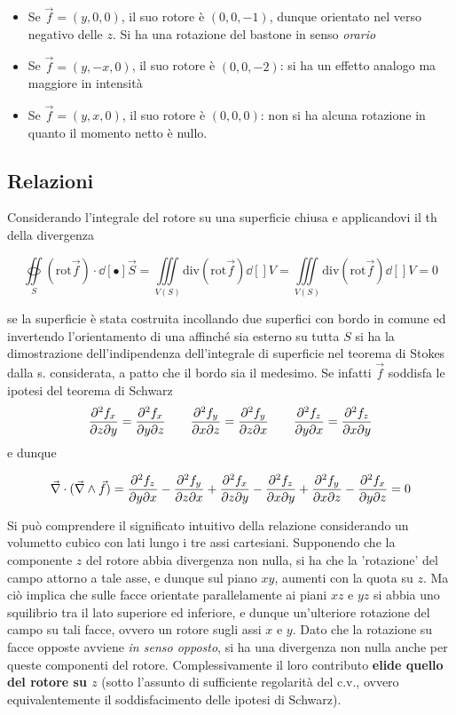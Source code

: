 \begin{itemize}

\item Se $\vec{f} = (y, 0, 0)$, il suo rotore è $(0,0,-1)$, dunque orientato nel verso negativo delle $z$. Si ha una rotazione del bastone in senso \textit{orario}

\item Se $\vec{f} = (y, -x, 0)$, il suo rotore è $(0,0,-2)$: si ha un effetto analogo ma maggiore in intensità

\item Se $\vec{f} = (y, x, 0)$, il suo rotore è $(0,0,0)$: non si ha alcuna rotazione in quanto il momento netto è nullo.

\end{itemize}

\subsection{Relazioni}

Considerando l'integrale del rotore su una superficie chiusa e applicandovi il th della divergenza

\[\oiint\limits_{S} (\mathrm{rot} \vec{f}) \cdot \dd[•]{\vec{S}} = \iiint\limits_{V(S)} \mathrm{div} (\mathrm{rot} \vec{f}) \dd[]{V} = \iiint\limits_{V(S)} \mathrm{div} (\mathrm{rot} \vec{f}) \dd[]{V} = 0\]

se la superficie è stata costruita incollando due superfici con bordo in comune ed invertendo l'orientamento di una affinché sia esterno su tutta $S$ si ha la dimostrazione dell'indipendenza dell'integrale di superficie nel teorema di Stokes dalla s. considerata, a patto che il bordo sia il medesimo. Se infatti $\vec{f}$ soddisfa le ipotesi del teorema di Schwarz 
\[\pdv[•]{f_x}{z}{y} = \pdv[•]{f_x}{y}{z} \qquad \pdv[•]{f_y}{x}{z} = \pdv[•]{f_y}{z}{x} \qquad \pdv[•]{f_z}{y}{x} = \pdv[•]{f_z}{x}{y}\]
e dunque

\[\vec{\nabla} \cdot (\vec{\nabla} \wedge \vec{f})  = \pdv[•]{f_z}{y}{x} - \pdv[•]{f_y}{z}{x} + \pdv[•]{f_x}{z}{y} - \pdv[•]{f_z}{x}{y} + \pdv[•]{f_y}{x}{z} - \pdv[•]{f_x}{y}{z} = 0\]

Si può comprendere il significato intuitivo della relazione considerando un volumetto cubico con lati lungo i tre assi cartesiani. Supponendo che la componente $z$ del rotore abbia divergenza non nulla, si ha che la 'rotazione' del campo attorno a tale asse, e dunque sul piano $xy$, aumenti con la quota su $z$. Ma ciò implica che sulle facce orientate parallelamente ai piani $xz$ e $yz$ si abbia uno squilibrio tra il lato superiore ed inferiore, e dunque un'ulteriore rotazione del campo su tali facce, ovvero un rotore sugli assi $x$ e $y$. Dato che la rotazione su facce opposte avviene \textit{in senso opposto}, si ha una divergenza non nulla anche per queste componenti del rotore. Complessivamente il loro contributo \textbf{elide quello del rotore su $z$} (sotto l'assunto di sufficiente regolarità del c.v., ovvero equivalentemente il soddisfacimento delle ipotesi di Schwarz).

